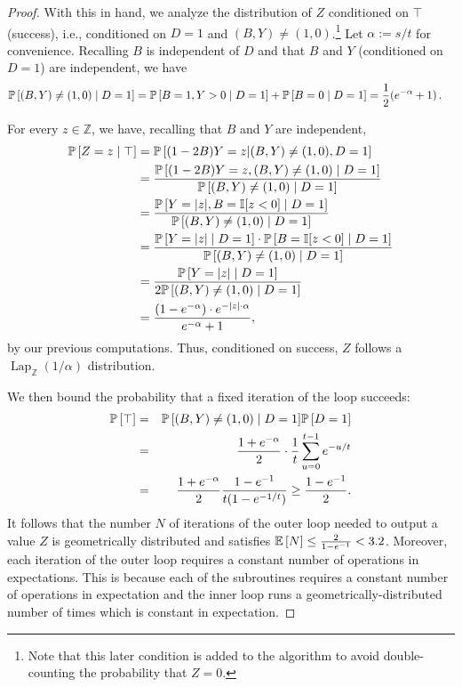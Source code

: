 \documentclass{jpcfinal} %
\newcommand{\discL}{\operatorname{Lap}_{\Z}} \newcommand{\discN}{\mathcal{N}_{\Z}}
\newcommand{\ex}[2]{{\ifx&#1& \mathbb{E} \else
\underset{#1}{\mathbb{E}} \fi \left[#2\right]}}
\newcommand{\pr}[2]{{\ifx&#1& \mathbb{P} \else
\underset{#1}{\mathbb{P}} \fi \left[#2\right]}}
\newcommand{\eqdef}{:=}
\newcommand{\Z}{\mathbb{Z}}
\begin{document}
\begin{proof}
With this in hand, we analyze the distribution of $Z$ conditioned on $\top$ (success), i.e., conditioned on $D=1$ and $(B,Y)\neq(1,0)$.\footnote{Note that this later condition is added to the algorithm to avoid double-counting the probability that $Z=0$.} Let $\alpha \eqdef s/t$ for convenience.  Recalling $B$ is independent of $D$ and that $B$ and $Y$ (conditioned on $D=1$) are independent, we have
\begin{align*}
    \pr{}{(B,Y)\neq (1,0) \mid D=1} &= \pr{}{ B=1, Y>0 \mid D=1}+\pr{}{B=0 \mid D=1} = \frac{1}{2}(e^{-\alpha}+1)\,.
\end{align*}

\noindent For every $z\in\Z$, we have, recalling that $B$ and $Y$ are independent,
\begin{align*}
    \pr{}{Z=z \mid \top} &= \pr{}{(1-2B)Y=z|(B,Y)\ne(1,0),D=1}\\
    &=  \frac{ \pr{}{(1-2B)Y=z, (B,Y)\neq (1,0) \mid D=1} }{  \pr{}{(B,Y)\neq (1,0) \mid D=1} } \\
    &=  \frac{\pr{}{Y=|z|, B=\mathbb{I}[z<0] \mid D=1} }{  \pr{}{(B,Y)\neq (1,0) \mid D=1} } \\
    &=  \frac{ \pr{}{Y=|z| \mid D=1} \cdot \pr{}{B=\mathbb{I}[z<0] \mid D=1} }{\pr{}{(B,Y)\neq (1,0) \mid D=1}}\\
    &=  \frac{ \pr{}{Y=|z| \mid D=1} }{2\pr{}{(B,Y)\neq (1,0) \mid D=1}}\\
    &= \frac{(1-e^{-\alpha}) \cdot e^{-|z| \cdot \alpha}}{e^{-\alpha}+1},
\end{align*}
by our previous computations. Thus, conditioned on success, $Z$ follows a $\discL(1/\alpha)$ distribution.

We then bound the probability that a fixed iteration of the loop succeeds:
\begin{eqnarray*}
    \pr{}{\top} & = & \pr{}{(B,Y)\neq (1,0)\mid D=1}\pr{}{D=1} \\
     & = & \frac{1+e^{-\alpha}}{2}\cdot \frac{1}{t}\sum_{u=0}^{t-1}e^{-u/t}\\
     & = & \frac{1+e^{-\alpha}}{2}\frac{1-e^{-1}}{t(1-e^{-1/t})} \geq \frac{1-e^{-1}}{2}.
\end{eqnarray*}
It follows that the number $N$ of iterations of the outer loop needed to output a value $Z$ is geometrically distributed and satisfies $\ex{}{N} \leq \frac{2}{1-e^{-1}} < 3.2$. Moreover, each iteration of the outer loop requires a constant number of operations in expectations. This is because each of the subroutines requires a constant number of operations in expectation and the inner loop runs a geometrically-distributed number of times which is constant in expectation. \end{proof}
\end{document}
